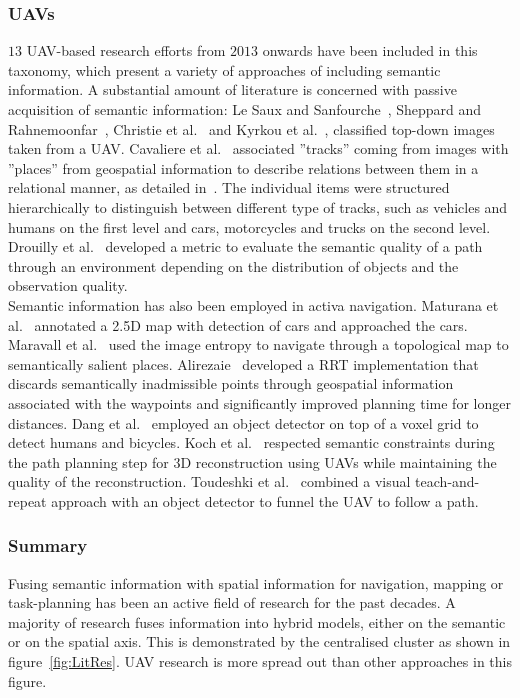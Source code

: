 \documentclass[twocolumn,letterpaper]{IEEEAerospaceCLS}  %
\begin{document}
\subsubsection{UAVs} \label{sssec:ResLitUAV}
$13$ UAV-based research efforts from $2013$ onwards have been included in this taxonomy, which present a variety of approaches of including semantic information. A substantial amount of literature is concerned with passive acquisition of semantic information: 
Le Saux and Sanfourche~\cite{saux_rapid_2013}, Sheppard and Rahnemoonfar~\cite{sheppard_real-time_2017}, Christie et al.~\cite{christie_semantics_2016} and Kyrkou et al.~\cite{kyrkou_dronet:_2018}, classified top-down images taken from a UAV. Cavaliere et al.~\cite{cavaliere_towards_2016,cavaliere_towards_2018} associated ''tracks'' coming from images with ''places'' from geospatial information to describe relations between them in a relational manner, as detailed in~\cite{landsiedel_review_2017}. The individual items were structured hierarchically to distinguish between different type of tracks, such as vehicles and humans on the first level and cars, motorcycles and trucks on the second level. Drouilly et al.~\cite{drouilly_semantic_2015} developed a metric to evaluate the semantic quality of a path through an environment depending on the distribution of objects and the observation quality.\\
Semantic information has also been employed in activa navigation. Maturana et al.~\cite{maturana_looking_2017} annotated a 2.5D map with detection of cars and approached the cars. Maravall et al.~\cite{maravall_navigation_2017} used the image entropy to navigate through a topological map to semantically salient places. Alirezaie~\cite{alirezaie_exploiting_2017} developed a RRT implementation that discards semantically inadmissible points through geospatial information associated with the waypoints and significantly improved planning time for longer distances. Dang et al.~\cite{dang_autonomous_2018} employed an object detector on top of a voxel grid to detect humans and bicycles. Koch et al.~\cite{koch_automatic_2019} respected semantic constraints during the path planning step for 3D reconstruction using UAVs while maintaining the quality of the reconstruction.
Toudeshki et al.~\cite{toudeshki_robust_2018} combined a visual teach-and-repeat approach with an object detector to funnel the UAV to follow a path.
\subsubsection{Summary} \label{sssec:ResLitSum}
Fusing semantic information with spatial information for navigation, mapping or task-planning has been an active field of research for the past decades. A majority of research fuses information into hybrid models, either on the semantic or on the spatial axis. This is demonstrated by the centralised cluster as shown in figure~\ref{fig:LitRes}. UAV research is more spread out than other approaches in this figure.
\end{document}

